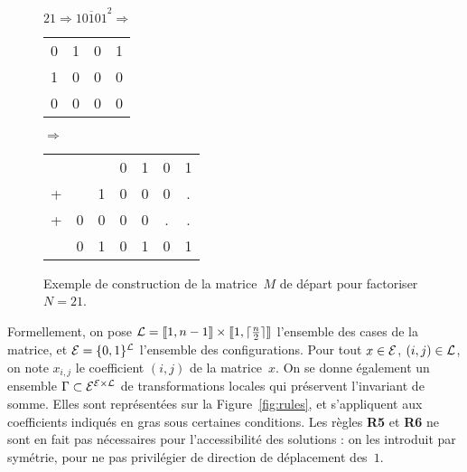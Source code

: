 \begin{figure}[h]
\centering

$21 \Rightarrow \overline{10101}^2 \Rightarrow$
\begin{tabular}{cccc}
0&1&0&1\\
1&0&0&0\\
0&0&0&0\\
\end{tabular}
$\Rightarrow$
\begin{tabular}{ccccccc}
&&&0&1&0&1\\
+&&1&0&0&0&.\\
+&0&0&0&0&.&.\\
\hline
&0&1&0&1&0&1\\
\end{tabular}

\caption{Exemple de construction de la matrice~$M$ de départ pour factoriser $N=21$.}
\label{fig:init}
\end{figure}

Formellement, on pose $\mathcal{L}=[\kern-0.15em [ 1, n-1 ]\kern-0.15em] \times [\kern-0.15em [ 1, \lceil\frac{n}{2}\rceil]\kern-0.15em]$ l'ensemble des cases de la matrice, et $\mathcal{E}=\{0,1\}^{\mathcal{L}}$ l'ensemble des configurations. Pour tout $x \in \mathcal{E}$, $(i,j)\in\mathcal{L}$, on note $x_{i,j}$ le coefficient $(i,j)$ de la matrice~$x$. 
On se donne également un ensemble $\Gamma \subset \mathcal{E}^{\mathcal{E}\times\mathcal{L}}$ de transformations locales qui préservent l'invariant de somme. Elles sont représentées sur la Figure~\ref{fig:rules}, et s'appliquent aux coefficients indiqués en gras sous certaines conditions. Les règles \textbf{R5} et \textbf{R6} ne sont en fait pas nécessaires pour l'accessibilité des solutions : on les introduit par symétrie, pour ne pas privilégier de direction de déplacement des~$1$. 


